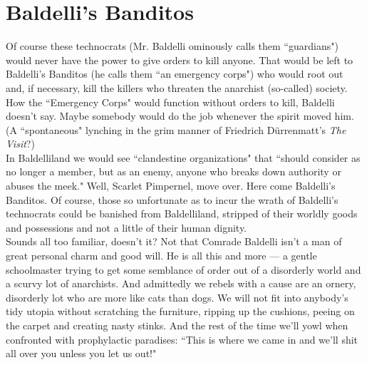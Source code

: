 \section*{Baldelli's Banditos}
Of course these technocrats (Mr. Baldelli ominously calls them ``guardians") would never have the power to give orders to kill anyone. That would be left to Baldelli's Banditos (he calls them ``an emergency corps") who would root out and, if necessary, kill the killers who threaten the anarchist (so-called) society. How the ``Emergency Corps" would function without orders to kill, Baldelli doesn't say. Maybe somebody would do the job whenever the spirit moved him. (A ``spontaneous" lynching in the grim manner of Friedrich Dürrenmatt's \emph{The Visit}?)\\
In Baldelliland we would see ``clandestine organizations" that ``should consider as no longer a member, but as an enemy, anyone who breaks down authority or abuses the meek." Well, Scarlet Pimpernel, move over. Here come Baldelli's Banditos. Of course, those so unfortunate as to incur the wrath of Baldelli's technocrats could be banished from Baldelliland, stripped of their worldly goods and possessions and not a little of their human dignity.\\
Sounds all too familiar, doesn't it? Not that Comrade Baldelli isn't a man of great personal charm and good will. He is all this and more --- a gentle schoolmaster trying to get some semblance of order out of a disorderly world and a scurvy lot of anarchists. And admittedly we rebels with a cause are an ornery, disorderly lot who are more like cats than dogs. We will not fit into anybody's tidy utopia without scratching the furniture, ripping up the cushions, peeing on the carpet and creating nasty stinks. And the rest of the time we'll yowl when confronted with prophylactic paradises: ``This is where we came in and we'll shit all over you unless you let us out!"

